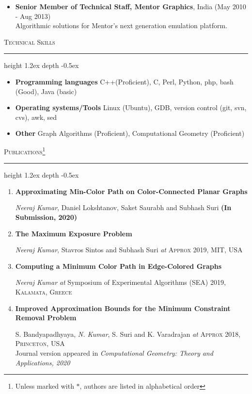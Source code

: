 \documentclass[11pt]{article}
\def\Vhrulefill{\leavevmode\leaders\hrule height 1.2ex depth \dimexpr2pt-0.5ex\hfill\kern0pt}
\begin{document}
{\begin{itemize}
	\item \textbf{Senior Member of Technical Staff, Mentor Graphics}, India \hfill(May 2010 - Aug 2013) \\
				Algorithmic solutions for Mentor's next generation emulation platform.
	
\end{itemize}

\noindent\textsc{Technical Skills}
\textcolor{mygray}{\noindent\Vhrulefill}
\begin{itemize}
	\item \textbf{Programming languages} C++(Proficient), C, Perl, Python, php, bash (Good), Java (basic)
	\item \textbf{Operating systems/Tools} Linux (Ubuntu), GDB, version control (git, svn, cvs), awk, sed
	\item \textbf{Other} Graph Algorithms (Proficient), Computational Geometry (Proficient)
\end{itemize}

\noindent\textsc{Publications\footnote{Unless marked with $*$, authors are listed in alphabetical order}}
\textcolor{mygray}{\noindent\Vhrulefill}
\begin{enumerate}
		
		\item \textbf{Approximating Min-Color Path on Color-Connected Planar Graphs}
				
				\emph{Neeraj Kumar}, Daniel Lokshtanov, Saket Saurabh and Subhash Suri
				\textbf{(In Submission, 2020)}

		\item \textbf{The Maximum Exposure Problem}
				
				\emph{Neeraj Kumar}, Stavros Sintos and Subhash Suri \emph{at}
				\textsc{Approx 2019, MIT, USA}

		\item \textbf{Computing a Minimum Color Path in Edge-Colored Graphs}
				
				\emph{Neeraj Kumar} \emph{at} Symposium of Experimental Algorithms \textsc{(SEA) 2019, Kalamata, Greece}

    \item \textbf{Improved Approximation Bounds for the Minimum Constraint Removal Problem}
				
				S. Bandyapadhyaya,  \emph{N. Kumar}, S. Suri and K. Varadrajan \emph{at} 
				\textsc{Approx 2018, Princeton, USA} \\ 
				Journal version appeared in \emph{Computational Geometry: Theory and Applications, 2020}


\end{enumerate}}
\end{document}
